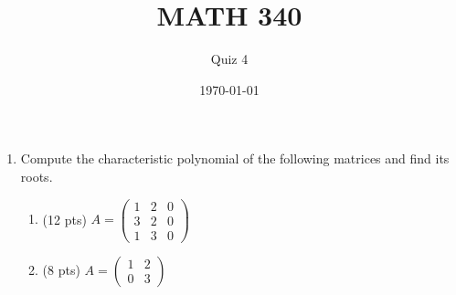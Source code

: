 \documentclass{article}
\begin{document}
\title{MATH 340}
\author{Quiz 4}
\date{\today}
\maketitle

\begin{enumerate}
	\item Compute the characteristic polynomial of the following matrices
		and find its roots.
\begin{enumerate}
	\item (12 pts) $A=\begin{pmatrix} 1 & 2 & 0\\ 3 & 2 & 0\\ 1 & 3 & 0\end{pmatrix}$
		\vspace{10cm}
	\item (8 pts) $A=\begin{pmatrix} 1 & 2\\ 0 & 3\end{pmatrix}$
\end{enumerate}
\end{enumerate}
\end{document}
